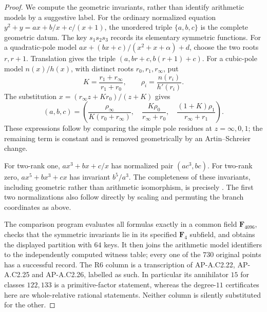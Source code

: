 \begin{proof}
We compute the geometric invariants, rather than identify arithmetic
models by a suggestive label. For the ordinary normalized equation
$y^2+y=ax+b/x+c/(x+1)$, the unordered triple $\{a,b,c\}$ is
the complete geometric datum. The key $s_1s_2s_3$ records its
elementary symmetric functions. For a quadratic-pole model
$ax+(bx+c)/(x^2+x+\alpha)+d$, choose the two roots $r,r+1$.
Translation gives the triple $(a,br+c,b(r+1)+c)$.
For a cubic-pole model $n(x)/h(x)$, with distinct roots
$r_0,r_1,r_\infty$, put
\[
 K=\frac{r_1+r_\infty}{r_1+r_0},\qquad
 \rho_i=\frac{n(r_i)}{h'(r_i)}.
\]
The substitution $x=(r_\infty z+Kr_0)/(z+K)$ gives
\[
 (a,b,c)=\left(
 \frac{\rho_\infty}{K(r_0+r_\infty)},\quad
 \frac{K\rho_0}{r_\infty+r_0},\quad
 \frac{(1+K)\rho_1}{r_\infty+r_1}\right).
\]
These expressions follow by comparing the simple pole residues at
$z=\infty,0,1$; the remaining term is constant and is removed
geometrically by an Artin--Schreier change.

For two-rank one, $ax^3+bx+c/x$ has normalized pair
$(ac^3,bc)$. For two-rank zero, $ax^5+bx^3+cx$ has invariant
$b^5/a^3$. The completeness of these invariants, including
geometric rather than arithmetic isomorphism, is precisely
\cite[Definition~19, Theorems~20 and~22, Corollary~23]{AR_CNP2005}.
The first two normalizations also follow directly by scaling and
permuting the branch coordinates as above.

The comparison program evaluates all formulas exactly in a common
field $\mathbf F_{4096}$, checks that the symmetric invariants lie
in its specified $\mathbf F_4$ subfield, and obtains the displayed
partition with $64$ keys. It then joins the arithmetic model
identifiers to the independently computed witness table; every
one of the $730$ original points has a successful record.
The R6 column is a transcription of AP-A.C2.22, AP-A.C2.25 and
AP-A.C2.26, labelled as such. In particular its annihilator $15$
for classes $122,133$ is a primitive-factor statement, whereas
the degree-$11$ certificates here are whole-relative rational
statements. Neither column is silently substituted for the other.
\end{proof}

